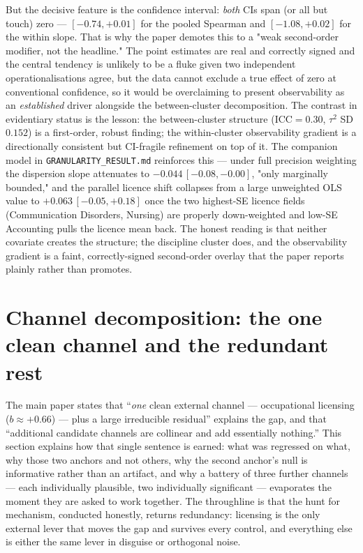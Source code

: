 \documentclass[11pt]{article}
\begin{document}
But the decisive feature is the confidence interval: \emph{both} CIs span (or all but touch) zero --- $[-0.74,+0.01]$ for the pooled Spearman and $[-1.08,+0.02]$ for the within slope. That is why the paper demotes this to a "weak second-order modifier, not the headline." The point estimates are real and correctly signed and the central tendency is unlikely to be a fluke given two independent operationalisations agree, but the data cannot exclude a true effect of zero at conventional confidence, so it would be overclaiming to present observability as an \emph{established} driver alongside the between-cluster decomposition. The contrast in evidentiary status is the lesson: the between-cluster structure ($\mathrm{ICC}=0.30$, $\tau^2$ SD $0.152$) is a first-order, robust finding; the within-cluster observability gradient is a directionally consistent but CI-fragile refinement on top of it. The companion model in \texttt{GRANULARITY\_RESULT.md} reinforces this --- under full precision weighting the dispersion slope attenuates to $-0.044\,[-0.08,-0.00]$, "only marginally bounded," and the parallel licence shift collapses from a large unweighted OLS value to $+0.063\,[-0.05,+0.18]$ once the two highest-SE licence fields (Communication Disorders, Nursing) are properly down-weighted and low-SE Accounting pulls the licence mean back. The honest reading is that neither covariate creates the structure; the discipline cluster does, and the observability gradient is a faint, correctly-signed second-order overlay that the paper reports plainly rather than promotes.\section{Channel decomposition: the one clean channel and the redundant rest}\label{sec:companion-channels}

The main paper states that ``\emph{one} clean external channel --- occupational licensing ($b\approx+0.66$) --- plus a large irreducible residual'' explains the gap, and that ``additional candidate channels are collinear and add essentially nothing.'' This section explains how that single sentence is earned: what was regressed on what, why those two anchors and not others, why the second anchor's null is informative rather than an artifact, and why a battery of three further channels --- each individually plausible, two individually significant --- evaporates the moment they are asked to work together. The throughline is that the hunt for mechanism, conducted honestly, returns redundancy: licensing is the only external lever that moves the gap and survives every control, and everything else is either the same lever in disguise or orthogonal noise.
\end{document}

